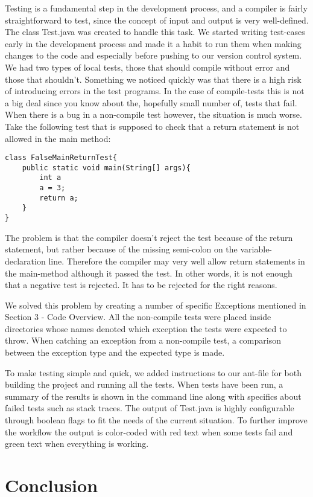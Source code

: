 \documentclass[paper=a4, fontsize=11pt]{scrartcl} %
\numberwithin{equation}{section} %
\numberwithin{figure}{section} %
\numberwithin{table}{section} %
\begin{document}
Testing is a fundamental step in the development process, and a compiler is fairly straightforward to test, since the concept of input and output is very well-defined.
The class Test.java was created to handle this task.
We started writing test-cases early in the development process and made it a habit to run them when making changes to the code and especially before pushing to our version control system.
We had two types of local tests, those that should compile without error and those that shouldn’t.
Something we noticed quickly was that there is a high risk of introducing errors in the test programs.
In the case of compile-tests this is not a big deal since you know about the, hopefully small number of, tests that fail.
When there is a bug in a non-compile test however, the situation is much worse.
Take the following test that is supposed to check that a return statement is not allowed in the main method:
\begin{verbatim}
class FalseMainReturnTest{
    public static void main(String[] args){
        int a
        a = 3;
        return a;
    }
}
\end{verbatim}
The problem is that the compiler doesn’t reject the test because of the return statement, but rather because of the missing semi-colon on the variable-declaration line.
Therefore the compiler may very well allow return statements in the main-method although it passed the test.
In other words, it is not enough that a negative test is rejected.
It has to be rejected for the right reasons.

We solved this problem by creating a number of specific Exceptions mentioned in Section 3 - Code Overview.
All the non-compile tests were placed inside directories whose names denoted which exception the tests were expected to throw.
When catching an exception from a non-compile test, a comparison between the exception type and the expected type is made. 

To make testing simple and quick, we added instructions to our ant-file for both building the project and running all the tests.
When tests have been run, a summary of the results is shown in the command line along with specifics about failed tests such as stack traces.
The output of Test.java is highly configurable through boolean flags to fit the needs of the current situation.
To further improve the workflow the output is color-coded with red text when some tests fail and green text when everything is working.

\section{Conclusion}
\end{document}
